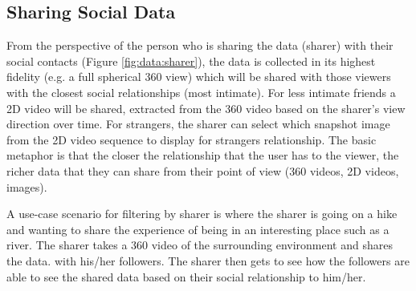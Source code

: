 

\subsection{Sharing Social Data}

From the perspective of the person who is sharing the data (sharer) with their social contacts (Figure \ref{fig:data:sharer}), the data is collected in its highest fidelity (e.g. a full spherical 360 view) which will be shared with those viewers with the closest social relationships (most intimate). For less intimate friends a 2D video will be shared, extracted from the 360 video based on the sharer's view direction over time. For strangers, the sharer can select which snapshot image from the 2D video sequence to display for strangers relationship. The basic metaphor is that the closer the relationship that the user has to the viewer, the richer data that they can share from their point of view (360 videos, 2D videos, images).

A use-case scenario for filtering by sharer is where the sharer is going on a hike and wanting to share the experience of being in an interesting place such as a river. The sharer takes a 360 video of the surrounding environment and shares the data. with his/her followers. The sharer then gets to see how the followers are able to see the shared data based on their social relationship to him/her.

